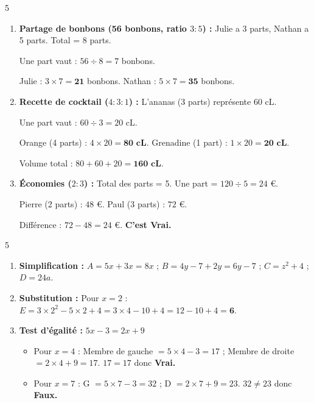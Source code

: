 \documentclass[a4paper]{book}
\begin{document}
{\begin{exerciceNote}{5}
        \begin{enumerate}
            \item \textbf{Partage de bonbons (56 bonbons, ratio $3:5$) :}
            Julie a 3 parts, Nathan a 5 parts. Total = 8 parts.
            
            Une part vaut : $56 \div 8 = 7$ bonbons.
            
            Julie : $3 \times 7 = \mathbf{21}$ bonbons. Nathan : $5 \times 7 = \mathbf{35}$ bonbons.
            
            \item \textbf{Recette de cocktail ($4:3:1$) :}
            L'ananas (3 parts) représente $60$ cL.
            
            Une part vaut : $60 \div 3 = 20$ cL.
            
            Orange (4 parts) : $4 \times 20 = \mathbf{80 \text{ cL}}$.
            Grenadine (1 part) : $1 \times 20 = \mathbf{20 \text{ cL}}$.
            
            Volume total : $80 + 60 + 20 = \mathbf{160 \text{ cL}}$.
            
            \item \textbf{Économies ($2:3$) :}
            Total des parts = 5. Une part = $120 \div 5 = 24$ \euro.
            
            Pierre (2 parts) : $48$ \euro. Paul (3 parts) : $72$ \euro.
            
            Différence : $72 - 48 = 24$ \euro. \textbf{C'est Vrai.}
        \end{enumerate}
    \end{exerciceNote}
    
    \begin{exerciceNote}{5}
        \begin{enumerate}
            \item \textbf{Simplification :} $A = 5x + 3x = 8x$ ; $B = 4y - 7 + 2y = 6y - 7$ ; $C = z^2 + 4$ ; $D = 24a$.
            \item \textbf{Substitution :} Pour $x=2$ : $E = 3 \times 2^2 - 5 \times 2 + 4 = 3 \times 4 - 10 + 4 = 12 - 10 + 4 = \mathbf{6}$.
            \item \textbf{Test d'égalité :} $5x - 3 = 2x + 9$
            \begin{itemize}
                \item Pour $x=4$ : Membre de gauche $= 5 \times 4 - 3 = 17$ ; Membre de droite $= 2 \times 4 + 9 = 17$. $17=17$ donc \textbf{Vrai.}
                \item Pour $x=7$ : G $= 5 \times 7 - 3 = 32$ ; D $= 2 \times 7 + 9 = 23$. $32 \neq 23$ donc \textbf{Faux.}
            \end{itemize}
        \end{enumerate}
    \end{exerciceNote}
    
}
\end{document}
